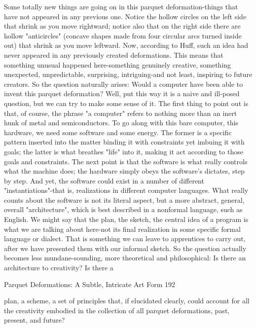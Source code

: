          Some totally new things are going on in this parquet deformation-things that have
not appeared in any previous one. Notice the hollow circles on the left side that shrink as
you move rightward; notice also that on the right side there are hollow "anticircles"
(concave shapes made from four circular arcs turned inside out) that shrink as you move
leftward. Now, according to Huff, such an idea had never appeared in any previously
created deformations. This means that something unusual happened here-something
genuinely creative, something unexpected, unpredictable, surprising, intriguing-and not
least, inspiring to future creators.
         So the question naturally arises: Would a computer have been able to invent this
parquet deformation? Well, put this way it is a naive and ill-posed question, but we can
try to make some sense of it. The first thing to point out is that, of course, the phrase "a
computer" refers to nothing more than an inert hunk of metal and semiconductors. To go
along with this bare computer, this hardware, we need some software and some energy.
The former is a specific pattern inserted into the matter binding it with constraints yet
imbuing it with goals; the latter is what breathes "life" into it, making it act according to
those goals and constraints.
         The next point is that the software is what really controls what the machine does;
the hardware simply obeys the software's dictates, step by step. And yet, the software
could exist in a number of different "instantiations"-that is, realizations in different
computer languages. What really counts about the software is not its literal aspect, but a
more abstract, general, overall "architecture", which is best described in a nonformal
language, such as English. We might say that the plan, the sketch, the central idea of a
program is what we are talking about here-not its final realization in some specific formal
language or dialect. That is something we can leave to apprentices to carry out, after we
have presented them with our informal sketch.
         So the question actually becomes less mundane-sounding, more theoretical and
philosophical: Is there an architecture to creativity? Is there a




Parquet Deformations: A Subtle, Intricate Art Form                                       192

plan, a scheme, a set of principles that, if elucidated clearly, could account for all the
creativity embodied in the collection of all parquet deformations, past, present, and
future?

